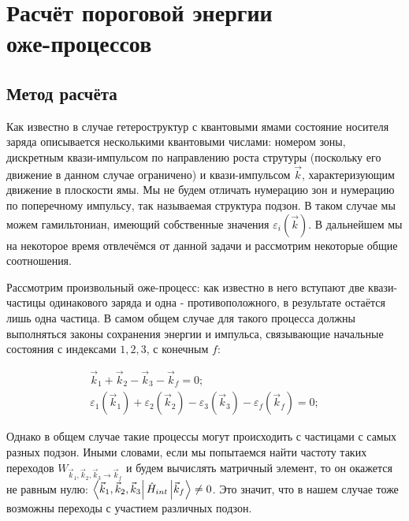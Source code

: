 \documentclass[../main.tex]{subfiles}
\begin{document}
    \chapter{Расчёт пороговой энергии\\ оже-процессов}
    \section{Метод расчёта}

    Как известно в случае гетероструктур с квантовыми ямами состояние
    носителя заряда описывается несколькими квантовыми числами: номером зоны,
    дискретным квази-импульсом по направлению роста струтуры (поскольку его движение
    в данном случае ограничено) и квази-импульсом $\vec k$, характеризующим движение
    в плоскости ямы. Мы не будем отличать нумерацию зон и нумерацию
    по поперечному импульсу, так называемая структура подзон. В таком случае мы 
    можем гамильтониан, имеющий собственные значения $\varepsilon_i (\vec{k})$. 
    В дальнейшем мы на некоторое время отвлечёмся от данной задачи и 
    рассмотрим некоторые общие соотношения.

    Рассмотрим произвольный оже-процесс: как известно в него вступают две квази-частицы
    одинакового заряда и одна - противоположного, в результате остаётся лишь одна частица.
    В самом общем случае для такого процесса должны выполняться законы сохранения энергии и 
    импульса, связывающие начальные состояния с индексами $1,2,3$, с конечным $f$:

    \begin{equation}
        \begin{array}{l}
            \vec{k}_1 + \vec{k}_2 - \vec{k}_3 - \vec{k}_f = 0;\\
            \varepsilon_1(\vec{k}_1) + \varepsilon_2(\vec{k}_2) - \varepsilon_3(\vec{k}_3) - \varepsilon_f(\vec{k}_f) = 0;
        \end{array}
    \end{equation}

    Однако в общем случае такие процессы могут происходить с частицами с самых 
    разных подзон. Иными словами, если мы попытаемся найти частоту таких переходов
    $W_{\vec{k}_1, \vec{k}_2, \vec{k}_3 \rightarrow \vec{k}_f}$ и будем вычислять
    матричный элемент, то он окажется не равным нулю:
    $\bra{\vec{k}_1, \vec{k}_2, \vec{k}_3} \hat{H}_{int} \ket{\vec{k}_f} \neq 0$.
    Это значит, что в нашем случае тоже возможны переходы с участием различных 
    подзон.
\end{document}
